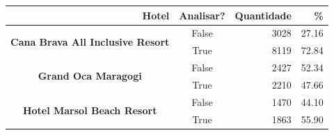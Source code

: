 \begin{table}[]
	\centering
	\begin{tabular}{|c|c|r|r|}
		\hline
		\multicolumn{1}{|r|}{\textbf{Hotel}}                                    &
		\multicolumn{1}{r|}{\textbf{Analisar?}}                                 &
		\textbf{Quantidade}                                                     &
		\textbf{\%}                                                               \\ \hline
		\multirow{2}{*}{\textbf{Cana Brava All Inclusive Resort}}               &
		False                                                                   &
		3028                                                                    &
		27.16                                                                     \\ \cline{2-4}
		                                                                        &
		True                                                                    &
		8119                                                                    &
		72.84                                                                     \\ \hline
		\multirow{2}{*}{\textbf{Grand Oca Maragogi}}                            &
		False                                                                   &
		2427                                                                    &
		52.34                                                                     \\ \cline{2-4}
		                                                                        &
		True                                                                    &
		2210                                                                    &
		47.66                                                                     \\ \hline
		\multirow{2}{*}{\textbf{Hotel Marsol Beach Resort}}                     &
		False                                                                   &
		1470                                                                    &
		44.10                                                                     \\ \cline{2-4}
		                                                                        &
		True                                                                    &
		1863                                                                    &
		55.90                                                                     \\ \hline

\end{tabular}
\end{table}
